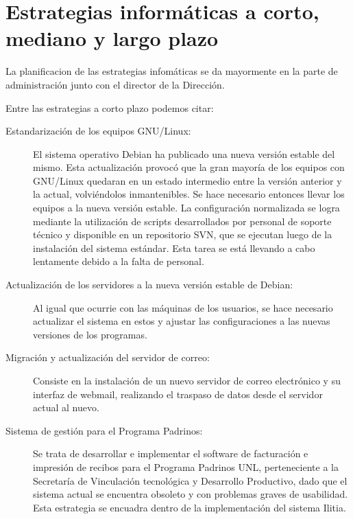 \documentclass[a4paper,11pt,oneside]{article}
\begin{document}
\section{Estrategias informáticas a corto, mediano y largo plazo}
%
La planificacion de las estrategias infomáticas se da mayormente en la
parte de administración junto con el director de la Dirección.

Entre las estrategias a corto plazo podemos citar:
%
\begin{description}
%
\item[Estandarización de los equipos GNU/Linux:]
  El sistema operativo Debian ha publicado una nueva versión estable
  del mismo. Esta actualización provocó que la gran mayoría de los
  equipos con GNU/Linux quedaran en un estado intermedio entre la
  versión anterior y la actual, volviéndolos inmantenibles. Se hace
  necesario entonces llevar los equipos a la nueva versión estable.
  La configuración normalizada se logra mediante la utilización de
  scripts desarrollados por personal de soporte técnico y disponible
  en un repositorio SVN, que se ejecutan luego de la instalación del
  sistema estándar.  Esta tarea se está llevando a cabo lentamente
  debido a la falta de personal.
%
\item[Actualización de los servidores a la nueva versión estable de
  Debian:]
  Al igual que ocurrie con las máquinas de los usuarios,
  se hace necesario actualizar el sistema en estos y ajustar las
  configuraciones a las nuevas versiones de los programas.
%
\item[Migración y actualización del servidor de correo:]
  Consiste en la instalación de un nuevo servidor de correo
  electrónico y su interfaz de webmail, realizando el traspaso de
  datos desde el servidor actual al nuevo.
%
\item[Sistema de gestión para el Programa Padrinos:]
  Se trata de desarrollar e implementar el software de facturación e
  impresión de recibos para el Programa Padrinos UNL, perteneciente a
  la Secretaría de Vinculación tecnológica y Desarrollo Productivo,
  dado que el sistema actual se encuentra obsoleto y con problemas
  graves de usabilidad. Esta estrategia se encuadra dentro de la
  implementación del sistema Ilitia.
%
\end{description}
\end{document}
